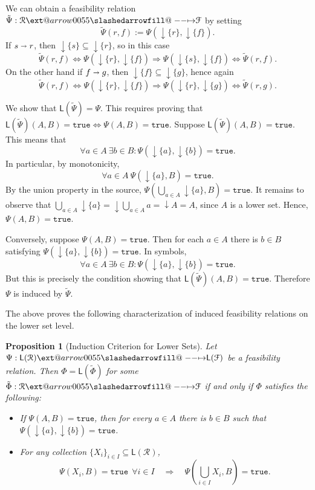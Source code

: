 \documentclass[12pt]{article}
\makeatletter
\theoremstyle{definition}
\theoremstyle{plain}
\theoremstyle{plain}
\newtheorem{proposition}{Proposition}[section]
\theoremstyle{plain}
\theoremstyle{plain}
\theoremstyle{remark}
\theoremstyle{remark}
\newcommand{\mc}[1]{\mathcal{#1}}
\newcommand{\sub}{\subseteq}
\newcommand{\low}{\mathsf{L}}
\newcommand{\true}{\mathtt{true}}
\newcommand{\lwc}[1]{{\downarrow #1}}
\def\slashedarrowfill@#1#2#3#4#5{%
	$\m@th\thickmuskip0mu\medmuskip\thickmuskip\thinmuskip\thickmuskip
	\relax#5#1\mkern-7mu%
	\cleaders\hbox{$#5\mkern-2mu#2\mkern-2mu$}\hfill
	\mathclap{#3}\mathclap{#2}%
	\cleaders\hbox{$#5\mkern-2mu#2\mkern-2mu$}\hfill
	\mkern-7mu#4$%
}
\def\rightslashedarrowfill@{%
	\slashedarrowfill@\relbar\relbar\mapstochar\rightarrow}
\newcommand\xslashedrightarrow[2][]{%
	\ext@arrow 0055{\rightslashedarrowfill@}{#1}{#2}}
\makeatother
\begin{document}
We can obtain a feasibility relation $\tilde\Psi: \mc{R} \xslashedrightarrow{} \mc{F}$ by setting $$\tilde\Psi(r,f) := \Psi(\lwc{\{r\}},\lwc{\{f\}}).$$ If $s \shortrightarrow r$, then $\lwc{\{s\}} \sub \lwc{\{r\}}$, so in this case $$\tilde\Psi(r,f) \Leftrightarrow \Psi(\lwc{\{r\}},\lwc{\{f\}}) \Rightarrow \Psi(\lwc{\{s\}},\lwc{\{f\}}) \Leftrightarrow \tilde\Psi(r,f).$$
On the other hand if $f \shortrightarrow g$, then $\lwc{\{f\}} \sub \lwc{\{g\}}$, hence again
$$\tilde\Psi(r,f) \Leftrightarrow \Psi(\lwc{\{r\}},\lwc{\{f\}}) \Rightarrow \Psi(\lwc{\{r\}},\lwc{\{g\}}) \Leftrightarrow \tilde\Psi(r,g).$$

We show that $\low(\tilde\Psi) = \Psi$. This requires proving that $\low(\tilde\Psi)(A,B) = \true \Leftrightarrow  \Psi(A,B) = \true$. Suppose $\low(\tilde\Psi)(A,B) = \true$. This means that 
$$\forall a \in A \: \exists b \in B: \Psi(\lwc{\{a\}},\lwc{\{b\}})=\true .$$
In particular, by monotonicity,
$$\forall a \in A \: \Psi(\lwc{\{a\}},B)=\true.$$ 
By the union property in the source, $\Psi(\bigcup_{a \in A}\lwc{\{a\}},B)=\true$. It remains to observe that $\bigcup_{a \in A} \lwc{\{a\}} = \lwc{\bigcup_{a \in A} a} = \lwc{A}= A$, since $A$ is a lower set. Hence, $\Psi(A,B) =\true$.

Conversely, suppose $\Psi(A,B) = \true$. Then for each $a \in A$ there is $b \in B$ satisfying $\Psi(\lwc{\{a\}},\lwc{\{b\}}) =\true$. In symbols,
$$\forall a \in A \: \exists b \in B: \Psi(\lwc{\{a\}},\lwc{\{b\}})=\true .$$
But this is precisely the condition showing that $\low(\tilde\Psi)(A,B)=\true$. Therefore $\Psi$ is induced by $\tilde\Psi$.

The above proves the following characterization of induced feasibility relations on the lower set level.
\begin{proposition}[Induction Criterion for Lower Sets]\label{prop:induction lower}
	Let $\Psi: \low(\mc{R}) \xslashedrightarrow{} \low(\mc{F})$ be a feasibility relation. Then $\Phi = \low(\tilde\Phi)$ for some $\tilde\Phi: \mc{R} \xslashedrightarrow{} \mc{F}$ if and only if $\Phi$ satisfies the following: 	
\begin{itemize}
	\item If $\Psi(A,B)=\true$, then for every $a \in A$ there is $b \in B$ such that $\Psi(\lwc{\{a\}},\lwc{\{b\}})=\true$.
	\item For any collection $\{X_i\}_{i \in I} \sub \low(\mc{R})$,
	$$\Psi(X_i,B) = \true \:\: \forall i \in I \quad \Rightarrow \quad \Psi(\bigcup_{i \in I} X_i,B) = \true.$$
\end{itemize}	
\end{proposition} 
\end{document}

